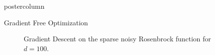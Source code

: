 \documentclass[dvipsnames]{beamer}
\begin{document}
\begin{frame}
\begin{columns}
\begin{column}{.5\textwidth}
\begin{beamercolorbox}[center]{postercolumn}
\begin{minipage}{.98\textwidth}
{\begin{myblock}{Gradient Free Optimization}
\begin{algorithm}[H]
\begin{algorithmic}[1]
                                \EndWhile
                            \end{algorithmic}
                        \end{algorithm}
                        \begin{figure}[htb]
                            \centering
                            \begin{subfigure}[t]{.5\textwidth}
                                
                            \end{subfigure}%
                            \begin{subfigure}[t]{.5\textwidth}
                                
                            \end{subfigure}%
                            \caption{Gradient Descent on the sparse noisy Rosenbrock function for $d=100$.}\label{fig:rosenbrock_vs}
                        \end{figure}
                        \vspace{-2cm}
                        \raggedleft{}
                    \end{myblock}
                    \vfill
            }\end{minipage}\end{beamercolorbox}
    \end{column}
\end{columns}
\end{frame}
\end{document}
